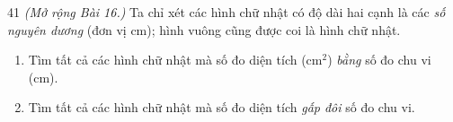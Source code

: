 \providecommand{\tbGrid}[4]{\begin{tikzpicture}[baseline=0.2cm,x=0.5cm,y=0.5cm]
  \draw[Ink,line width=0.7pt] (0,0) grid[step=1] (2,2);
  \node[font=\sffamily\bfseries,text=tmBlue!80!black,inner sep=0pt,#4] at (#1,#2) {#3};\end{tikzpicture}}
\providecommand{\rvbbG}[6]{\draw[Ink,line width=0.7pt] (#1,#2) rectangle ++(1,1)
  ({#1+0.5},#2)--++(0,1) (#1,{#2+0.5})--++(1,0);
  \node[font=\sffamily\bfseries,text=tmBlue!80!black,inner sep=0pt,#6] at ({#1+#3},{#2+#4}) {#5};}

\begin{probbox}{41}{}
\textit{(Mở rộng Bài 16.)} Ta chỉ xét các hình chữ nhật có độ dài hai cạnh là các \emph{số nguyên dương}
(đơn vị cm); hình vuông cũng được coi là hình chữ nhật.
\begin{enumerate}[label=\alph*),leftmargin=1.6em,itemsep=1pt]
\item Tìm tất cả các hình chữ nhật mà số đo diện tích (cm$^2$) \emph{bằng} số đo chu vi (cm).
\item Tìm tất cả các hình chữ nhật mà số đo diện tích \emph{gấp đôi} số đo chu vi.
\end{enumerate}
\end{probbox}
